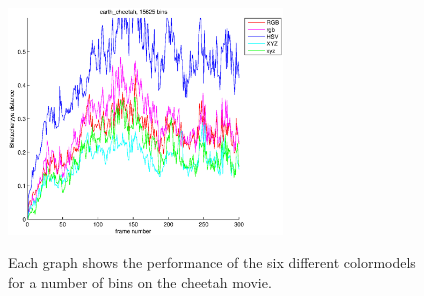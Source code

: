 \documentclass[11pt]{article}
\begin{document}
\begin{figure}[!ht]
{\includegraphics[height=6.0cm]{img/earth_cheetah_15625}
\label{fig:d}
}
\caption{Each graph shows the performance of the six different colormodels for
a number of bins on the cheetah movie.}
\label{fig:cheetah}
\end{figure}
\end{document}
